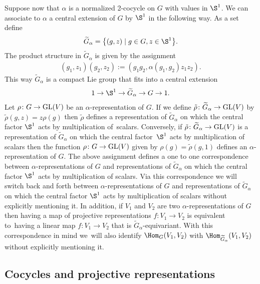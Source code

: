 Suppose now that $\alpha$ is a normalized 2-cocycle on $G$ with values in $\S^{1}$.
We can associate to $\alpha$ a central extension of $G$ by $\S^{1}$ in the following way.
As a set define
\begin{gather*}%
\widetilde{G}_{\alpha}=\big\{(g,z)\mid g\in G, z\in \S^{1}\big\}.
\end{gather*}
The product structure in $\widetilde{G}_{\alpha}$ is given by
the assignment
\begin{gather*}
(g_{1},z_{1})(g_{2},z_{2}):=\left(g_{1}g_{2},\alpha(g_{1},g_{2})z_{1}z_{2}\right).
\end{gather*}
This way $\widetilde{G}_{\alpha}$ is a compact Lie group that fits
into a central extension
\begin{gather*}
1\rightarrow \S^{1}\rightarrow
\widetilde{G}_{\alpha}\rightarrow G\rightarrow 1.
\end{gather*}
Let $\rho\colon G\to {\rm GL}(V)$ be an $\alpha$-representation of $G$. If we define
$\tilde{\rho}\colon \widetilde{G}_{\alpha}\to {\rm GL}(V)$
by $\tilde{\rho}(g,z)=z\rho(g)$ then $\tilde{\rho}$ defines a representation of
$\widetilde{G}_{\alpha}$ on which the central factor $\S^{1}$ acts by multiplication of~scalars.
Conversely, if $\tilde{\rho}\colon \widetilde{G}_{\alpha}\to {\rm GL}(V)$ is a representation of
$\widetilde{G}_{\alpha}$ on which the central factor~$\S^{1}$ acts by multiplication of scalars
then the function $\rho\colon G\to {\rm GL}(V)$ given by $\rho(g)=\tilde{\rho}(g,1)$ defines an
$\alpha$-representation of $G$. The above assignment defines a one to one correspondence between
$\alpha$-representations of $G$ and representations of $\widetilde{G}_{\alpha}$ on which the
central factor $\S^{1}$ acts by multiplication of scalars. Via this correspondence we will
switch back and forth between $\alpha$-representations of $G$ and representations of
$\widetilde{G}_{\alpha}$ on which the central factor $\S^{1}$ acts by multiplication of scalars
without explicitly mentioning it. In addition, if $V_{1}$ and $V_{2}$ are two
$\alpha$-repre\-sentations of $G$ then having a map of projective representations
$f\colon V_{1}\to V_{2}$ is equivalent to~having a linear map
$f\colon V_{1}\to V_{2}$ that is $\widetilde{G}_{\alpha}$-equivariant. With this correspondence
in mind we~will also identify $\Hom_{G}(V_{1},V_{2})$ with
$\Hom_{\widetilde{G}_{\alpha}}(V_{1},V_{2})$ without explicitly mentioning it.

\subsection{Cocycles and projective representations}\label{section cocycles}

